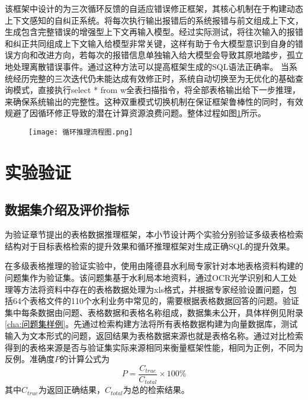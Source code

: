 该框架中设计的为三次循环反馈的自适应错误修正框架，其核心机制在于构建动态上下文感知的自纠正系统。将每次执行输出报错后的系统报错与前文组成上下文，生成包含完整错误的增强型上下文再输入模型。经过实际测试，将往次输入的报错和纠正共同组成上下文输入给模型非常关键，这样有助于令大模型意识到自身的错误方向和改进方向，若每次的报错信息单独输入给大模型会导致其原地踏步，孤立地处理离散错误事件。通过这种方法可以提高框架生成的SQL语法正确率。
当系统经历完整的三次迭代仍未能达成有效修正时，系统自动切换至为无优化的基础查询模式，直接执行select * from w全表扫描指令，将全部表格输出给下一步推理，来确保系统输出的完整性。这种双重模式切换机制在保证框架鲁棒性的同时，有效规避了因循环修正导致的潜在计算资源浪费问题。整体过程如图\ref{fig:4-8}所示。
\begin{figure}[h]
    \centering
    \texttt{[image: 循环推理流程图.png]}
    \label{fig:4-8}
\end{figure}

\section{实验验证}
\subsection{数据集介绍及评价指标}
为验证章节提出的表格数据推理框架，本小节设计两个实验分别验证多级表格检索结构对于目标表格检索的提升效果和循环推理框架对生成正确SQL的提升效果。

在多级表格推理的验证实验中，使用由隆德县水利局专家针对本地表格资料构建的问题集作为验证集。该问题集基于水利局本地资料，通过OCR光学识别和人工处理等方法将资料中存在的表格数据处理为xls格式，并根据专家经验设置问题，包括64个表格文件的110个水利业务中常见的，需要根据表格数据回答的问题。验证集中每条数据由问题、表格数据和表格名称组成，数据集未公开，具体样例见附录\ref{cha:问题集样例}。先通过检索构建方法将所有表格数据构建为向量数据库，测试输入为文本形式的问题，返回结果为表格数据来源也就是表格名称。通过对比检索得到的表格来源是否与验证集实际来源相同来衡量框架性能，相同为正例，不同为反例。准确度$P$的计算公式为
\begin{equation}
    P = \frac{C_{true}}{C_{total}} \times 100\%
\end{equation}
其中$C_{true}$为返回正确结果，$C_{total}$为总的检索结果。


